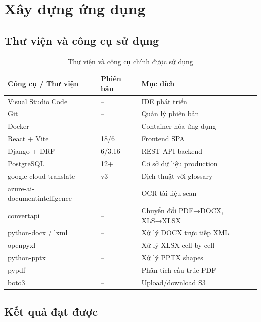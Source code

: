 \section{Xây dựng ứng dụng}

\subsection{Thư viện và công cụ sử dụng}

\begin{table}[H]
\centering
\caption{Thư viện và công cụ chính được sử dụng}
\label{tab:tools}
\renewcommand{\arraystretch}{1.3}
\begin{tabularx}{\textwidth}{|l|l|X|}
\hline
\textbf{Công cụ / Thư viện} & \textbf{Phiên bản} & \textbf{Mục đích} \\
\hline
Visual Studio Code     & --    & IDE phát triển \\
\hline
Git                    & --    & Quản lý phiên bản \\
\hline
Docker                 & --    & Container hóa ứng dụng \\
\hline
React + Vite           & 18/6  & Frontend SPA \\
\hline
Django + DRF           & 6/3.16& REST API backend \\
\hline
PostgreSQL             & 12+   & Cơ sở dữ liệu production \\
\hline
google-cloud-translate & v3    & Dịch thuật với glossary \\
\hline
azure-ai-documentintelligence & -- & OCR tài liệu scan \\
\hline
convertapi             & --    & Chuyển đổi PDF→DOCX, XLS→XLSX \\
\hline
python-docx / lxml     & --    & Xử lý DOCX trực tiếp XML \\
\hline
openpyxl               & --    & Xử lý XLSX cell-by-cell \\
\hline
python-pptx            & --    & Xử lý PPTX shapes \\
\hline
pypdf                  & --    & Phân tích cấu trúc PDF \\
\hline
boto3                  & --    & Upload/download S3 \\
\hline
\end{tabularx}
\end{table}

\subsection{Kết quả đạt được}

